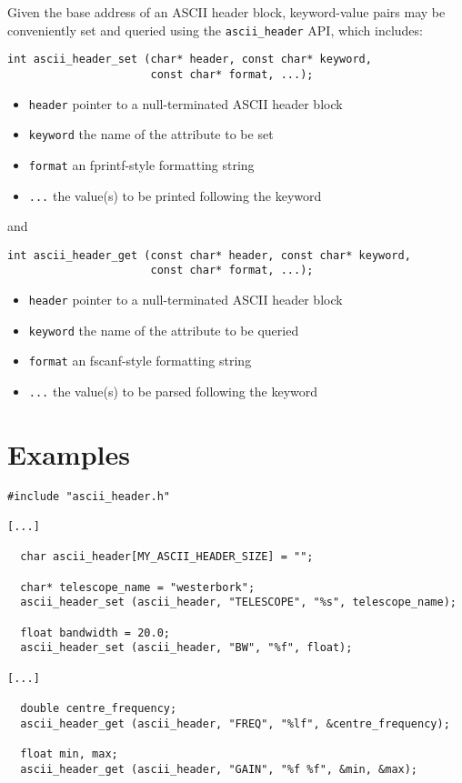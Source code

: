 Given the base address of an ASCII header block, keyword-value pairs
may be conveniently set and queried using the {\tt ascii\_header} API,
which includes:
\begin{verbatim}
int ascii_header_set (char* header, const char* keyword,
                      const char* format, ...);
\end{verbatim}
\vspace{-6mm}
\begin{itemize}
\item {\tt header} pointer to a null-terminated ASCII header block
\vspace{-2mm}
\item {\tt keyword} the name of the attribute to be set
\vspace{-2mm}
\item {\tt format} an fprintf-style formatting string
\vspace{-2mm}
\item {\tt ...} the value(s) to be printed following the keyword
\end{itemize}
and
\begin{verbatim}
int ascii_header_get (const char* header, const char* keyword,
                      const char* format, ...);
\end{verbatim}
\vspace{-6mm}
\begin{itemize}
\item {\tt header} pointer to a null-terminated ASCII header block
\vspace{-2mm}
\item {\tt keyword} the name of the attribute to be queried
\vspace{-2mm}
\item {\tt format} an fscanf-style formatting string
\vspace{-2mm}
\item {\tt ...} the value(s) to be parsed following the keyword
\end{itemize}

\section{Examples}

\begin{verbatim}
#include "ascii_header.h"

[...]

  char ascii_header[MY_ASCII_HEADER_SIZE] = "";

  char* telescope_name = "westerbork";
  ascii_header_set (ascii_header, "TELESCOPE", "%s", telescope_name);

  float bandwidth = 20.0;
  ascii_header_set (ascii_header, "BW", "%f", float);

[...]

  double centre_frequency;
  ascii_header_get (ascii_header, "FREQ", "%lf", &centre_frequency);

  float min, max;
  ascii_header_get (ascii_header, "GAIN", "%f %f", &min, &max);
\end{verbatim}

